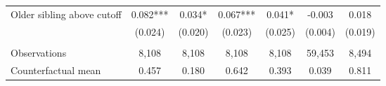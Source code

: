 {{\begin{tabular}{lcccccc}
Older sibling above cutoff&       0.082***&       0.034*  &       0.067***&       0.041*  &      -0.003   &       0.018   \\
                    &     (0.024)   &     (0.020)   &     (0.023)   &     (0.025)   &     (0.004)   &     (0.019)   \\
                    &               &               &               &               &               &               \\
Observations        &       8,108   &       8,108   &       8,108   &       8,108   &      59,453   &       8,494   \\
Counterfactual mean &       0.457   &       0.180   &       0.642   &       0.393   &       0.039   &       0.811   \\
 

\bottomrule
\end{tabular}
}
}
